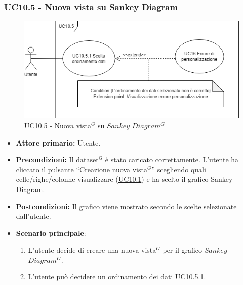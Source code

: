 
\subsubsection{UC10.5 - Nuova vista su Sankey Diagram}
\label{sec:UC10.5}
\begin{figure}[h!]
	\centering
	\includegraphics[scale=0.60]{../../assets/nuova_vista_sankey.png}
	\caption{UC10.5 - Nuova vista$^{G}$ su $Sankey$ $Diagram^{G}$}
\end{figure}
\begin{itemize}
    \item \textbf{Attore primario:} Utente.
    \item \textbf{Precondizioni:} Il ${\mathrm{dataset^{G}}}$ è stato caricato correttamente. L'utente ha cliccato il pulsante ``Creazione nuova vista$^{G}$'' scegliendo quali celle/righe/colonne visualizzare (\hyperref[sec:UC10.1]{UC10.1}) e ha scelto il grafico Sankey Diagram.
    \item \textbf{Postcondizioni:} Il grafico viene mostrato secondo le scelte selezionate dall'utente.
    \item \textbf{Scenario principale}:
    \begin{enumerate}
		\item L'utente decide di creare una nuova vista$^{G}$ per il grafico $Sankey$ $Diagram^{G}$.
		\item L'utente può decidere un ordinamento dei dati \hyperref[sec:UC10.5.1]{UC10.5.1}.
	\end{enumerate}
\end{itemize}

